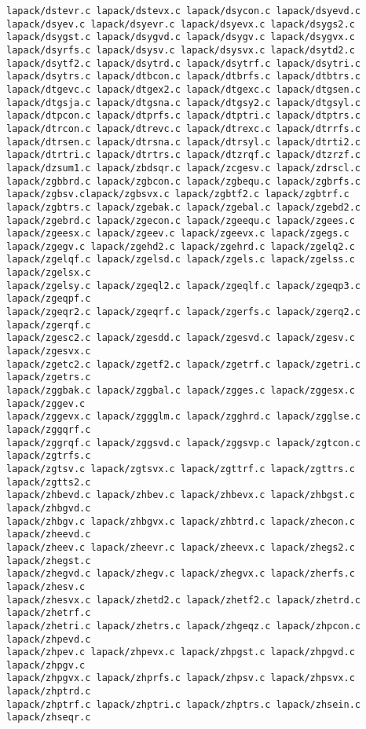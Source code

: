 \documentclass[10pt,a4paper]{article}
\begin{document}
\begin{codeparchment}
\begin{lstlisting}
lapack/dstevr.c lapack/dstevx.c lapack/dsycon.c lapack/dsyevd.c 
lapack/dsyev.c lapack/dsyevr.c lapack/dsyevx.c lapack/dsygs2.c 
lapack/dsygst.c lapack/dsygvd.c lapack/dsygv.c lapack/dsygvx.c 
lapack/dsyrfs.c lapack/dsysv.c lapack/dsysvx.c lapack/dsytd2.c 
lapack/dsytf2.c lapack/dsytrd.c lapack/dsytrf.c lapack/dsytri.c 
lapack/dsytrs.c lapack/dtbcon.c lapack/dtbrfs.c lapack/dtbtrs.c 
lapack/dtgevc.c lapack/dtgex2.c lapack/dtgexc.c lapack/dtgsen.c 
lapack/dtgsja.c lapack/dtgsna.c lapack/dtgsy2.c lapack/dtgsyl.c 
lapack/dtpcon.c lapack/dtprfs.c lapack/dtptri.c lapack/dtptrs.c 
lapack/dtrcon.c lapack/dtrevc.c lapack/dtrexc.c lapack/dtrrfs.c 
lapack/dtrsen.c lapack/dtrsna.c lapack/dtrsyl.c lapack/dtrti2.c 
lapack/dtrtri.c lapack/dtrtrs.c lapack/dtzrqf.c lapack/dtzrzf.c 
lapack/dzsum1.c lapack/zbdsqr.c lapack/zcgesv.c lapack/zdrscl.c 
lapack/zgbbrd.c lapack/zgbcon.c lapack/zgbequ.c lapack/zgbrfs.c 
lapack/zgbsv.clapack/zgbsvx.c lapack/zgbtf2.c lapack/zgbtrf.c 
lapack/zgbtrs.c lapack/zgebak.c lapack/zgebal.c lapack/zgebd2.c 
lapack/zgebrd.c lapack/zgecon.c lapack/zgeequ.c lapack/zgees.c 
lapack/zgeesx.c lapack/zgeev.c lapack/zgeevx.c lapack/zgegs.c 
lapack/zgegv.c lapack/zgehd2.c lapack/zgehrd.c lapack/zgelq2.c 
lapack/zgelqf.c lapack/zgelsd.c lapack/zgels.c lapack/zgelss.c lapack/zgelsx.c
lapack/zgelsy.c lapack/zgeql2.c lapack/zgeqlf.c lapack/zgeqp3.c lapack/zgeqpf.c
lapack/zgeqr2.c lapack/zgeqrf.c lapack/zgerfs.c lapack/zgerq2.c lapack/zgerqf.c
lapack/zgesc2.c lapack/zgesdd.c lapack/zgesvd.c lapack/zgesv.c lapack/zgesvx.c
lapack/zgetc2.c lapack/zgetf2.c lapack/zgetrf.c lapack/zgetri.c lapack/zgetrs.c
lapack/zggbak.c lapack/zggbal.c lapack/zgges.c lapack/zggesx.c lapack/zggev.c
lapack/zggevx.c lapack/zggglm.c lapack/zgghrd.c lapack/zgglse.c lapack/zggqrf.c
lapack/zggrqf.c lapack/zggsvd.c lapack/zggsvp.c lapack/zgtcon.c lapack/zgtrfs.c
lapack/zgtsv.c lapack/zgtsvx.c lapack/zgttrf.c lapack/zgttrs.c lapack/zgtts2.c
lapack/zhbevd.c lapack/zhbev.c lapack/zhbevx.c lapack/zhbgst.c lapack/zhbgvd.c
lapack/zhbgv.c lapack/zhbgvx.c lapack/zhbtrd.c lapack/zhecon.c lapack/zheevd.c
lapack/zheev.c lapack/zheevr.c lapack/zheevx.c lapack/zhegs2.c lapack/zhegst.c
lapack/zhegvd.c lapack/zhegv.c lapack/zhegvx.c lapack/zherfs.c lapack/zhesv.c
lapack/zhesvx.c lapack/zhetd2.c lapack/zhetf2.c lapack/zhetrd.c lapack/zhetrf.c
lapack/zhetri.c lapack/zhetrs.c lapack/zhgeqz.c lapack/zhpcon.c lapack/zhpevd.c
lapack/zhpev.c lapack/zhpevx.c lapack/zhpgst.c lapack/zhpgvd.c lapack/zhpgv.c
lapack/zhpgvx.c lapack/zhprfs.c lapack/zhpsv.c lapack/zhpsvx.c lapack/zhptrd.c
lapack/zhptrf.c lapack/zhptri.c lapack/zhptrs.c lapack/zhsein.c lapack/zhseqr.c

\end{lstlisting}
\end{codeparchment}
\end{document}
